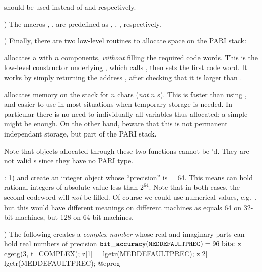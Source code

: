 
\noindent should be used instead of  and
 respectively.

) The macros , ,  are predefined
as , , , respectively.

) Finally, there are two low-level routines to allocate space on
the PARI stack:


allocates a  with $n$ components, \emph{without} filling the
required code words. This is the low-level constructor underlying
, which calls , then sets the first code word. It
works by simply returning the address , after checking
that it is larger than .


allocates memory on the stack for $n$ chars (\emph{not} $n$ s). This
is faster than using , and easier to use in most situations when
temporary storage is needed. In particular there is no need to 
individually all variables thus allocated: a simple 
might be enough. On the other hand, beware that this is not permanent
independant storage, but part of the PARI stack.

Note that objects allocated through these two functions cannot be
'd. They are not valid s since they have no PARI type.

: 1)  and
 create an integer object whose ``precision''
is  = 64. This means  can hold
rational integers of absolute value less than $2^{64}$. Note that in both
cases, the second codeword will \emph{not} be filled. Of course we could use
numerical values, e.g.~, but this would have different meanings
on different machines as  equals 64 on 32-bit machines,
but 128 on 64-bit machines.

) The following creates a \emph{complex number} whose real and
imaginary parts can hold real numbers of precision
${\tt bit\_accuracy(MEDDEFAULTPREC)} = 96\hbox{ bits:}$
%
\bprog
  z = cgetg(3, t_COMPLEX);
  z[1] = lgetr(MEDDEFAULTPREC);
  z[2] = lgetr(MEDDEFAULTPREC);
@eprog

